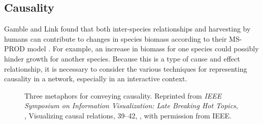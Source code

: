 \subsection{Causality}

Gamble and Link found that both inter-species relationships and harvesting by humans can contribute to changes in species biomass according to their MS-PROD model \cite{gamble2009}.  For example, an increase in biomass for one species could possibly hinder growth for another species.  Because this is a type of cause and effect relationship, it is necessary to consider the various techniques for representing causality in a network, especially in an interactive context.

\begin{figure}
\centering


\caption[Three metaphors for conveying causality]{Three metaphors for conveying causality.  Reprinted from \textit{IEEE Symposium on Information Visualization: Late Breaking Hot Topics}, \citeauthor{ware1999}, Visualizing causal relations, 39--42, \textcopyright \citeyear{ware1999}, with permission from IEEE.}

	\label{fig:vcv}
\end{figure}

